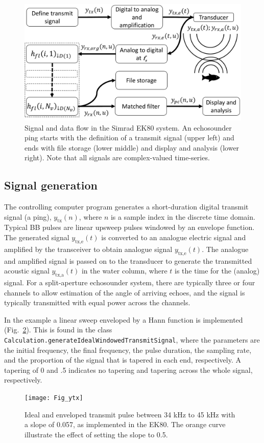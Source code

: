 \documentclass[preprint,12pt,TurnOnLineNumbers]{JASAnew}
\newcommand{\ek}{Simrad EK80}
\newcommand{\timesym}{t}
\newcommand{\samplesymt}{n}
\newcommand{\ytxe}{y_{\textrm{tx,e}}}
\newcommand{\ytxa}{y_{\textrm{tx,a}}}
\newcommand{\ytx}{y_{\textrm{tx}}}
\begin{document}
\begin{figure}
\includegraphics[width=16cm]{Fig_ek_sys}
\caption{\label{fi:ek_sys}Signal and data flow in the \ek{} system. An echosounder ping starts with the definition of a transmit signal (upper left) and ends with file storage (lower middle) and display and analysis (lower right). Note that all signals are complex-valued time-series.}
\end{figure}

\subsection{Signal generation}

The controlling computer program generates a short-duration digital transmit signal (a ping), $\ytx(\samplesymt)$, where $\samplesymt$ is a sample index in the discrete time domain. Typical BB pulses are linear upsweep pulses windowed by an envelope function. The generated signal $\ytxe(\timesym)$ is converted to an analogue electric signal and amplified by the transceiver to obtain analogue signal $\ytxe(\timesym)$. The analogue and amplified signal is passed on to the transducer to generate the transmitted acoustic signal $\ytxa(\timesym)$ in the water column, where $\timesym$ is the time for the (analog) signal. For a split-aperture echosounder system, there are typically three or four channels to allow estimation of the angle of arriving echoes, and the signal is typically transmitted with equal power across the channels.

In the example a linear sweep enveloped by a Hann function is implemented (Fig.~\ref{fi:ytx}). This is found in the class \verb|Calculation.generateIdealWindowedTransmitSignal|, where the parameters are the initial frequency, the final frequency, the pulse duration, the sampling rate, and the proportion of the signal that is tapered in each end, respectively. A tapering of 0 and .5 indicates no tapering and tapering across the whole signal, respectively.
\begin{figure}
\texttt{[image: Fig\_ytx]}
\caption{\label{fi:ytx} Ideal and enveloped transmit pulse between 34 kHz to 45 kHz with a slope of 0.057, as implemented in the EK80. The orange curve illustrate the effect of setting the slope to 0.5.}
\end{figure}
\end{document}
